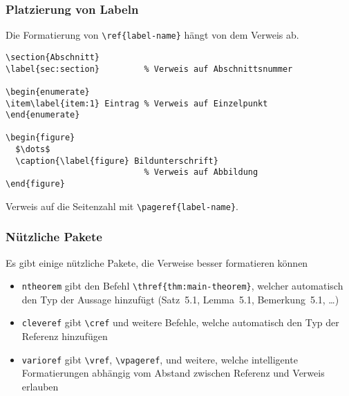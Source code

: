 \begin{frame}[fragile]
  \frametitle{Platzierung von Labeln}

  \onslide<+->

  Die Formatierung von \lstinline!\ref{label-name}! hängt von dem Verweis ab.

  \onslide<+->

\begin{lstlisting}
\section{Abschnitt}
\label{sec:section}         % Verweis auf Abschnittsnummer

\begin{enumerate}
\item\label{item:1} Eintrag % Verweis auf Einzelpunkt
\end{enumerate}

\begin{figure}
  $\dots$
  \caption{\label{figure} Bildunterschrift}
                            % Verweis auf Abbildung
\end{figure}
\end{lstlisting}

  \onslide<+->

  Verweis auf die Seitenzahl mit \lstinline!\pageref{label-name}!.

\end{frame}

\begin{frame}[fragile]
  \frametitle{Nützliche Pakete}

  \onslide<+->

  Es gibt einige nützliche Pakete, die Verweise besser formatieren können

  \begin{itemize}
  \item<+-> \lstinline!ntheorem! gibt den Befehl \lstinline!\thref{thm:main-theorem}!,
    welcher automatisch den Typ der Aussage hinzufügt (Satz~5.1, Lemma~5.1, Bemerkung~5.1,
    \dots)
  \item<+-> \lstinline!cleveref! gibt \lstinline!\cref! und weitere Befehle, welche
    automatisch den Typ der Referenz hinzufügen
  \item<+-> \lstinline!varioref! gibt \lstinline!\vref!, \lstinline!\vpageref!, und
    weitere, welche intelligente Formatierungen abhängig vom Abstand zwischen Referenz und
    Verweis erlauben
  \end{itemize}

\end{frame}